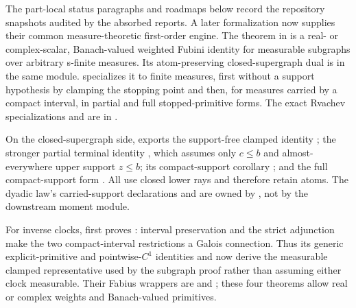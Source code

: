 \documentclass[11pt,oneside]{article}
\theoremstyle{definition}
\theoremstyle{remark}
\newcommand{\1}{\mathbf 1}
\begin{document}
\begin{statusbox}
The part-local status paragraphs and roadmaps below record the repository snapshots audited
by the absorbed reports.  A later formalization now supplies their common
measure-theoretic first-order engine.  The theorem
 in
 is a real- or complex-scalar, Banach-valued weighted Fubini
identity for measurable subgraphs over arbitrary s-finite measures.  Its
atom-preserving closed-supergraph dual is
 in the same module.
 specializes it to finite measures, first without a support
hypothesis by clamping the stopping point and then, for measures carried by a compact
interval, in partial and full stopped-primitive forms.  The exact Rvachev specializations
and
are in .

On the closed-supergraph side,  exports the support-free clamped
identity ; the stronger partial
terminal identity
, which assumes only
\(c\le b\) and almost-everywhere upper support \(z\le b\); its compact-support corollary
; and the full
compact-support form .
All use closed lower rays and therefore retain atoms.  The dyadic law's carried-support
declarations 
and  are owned
by , not by the downstream moment module.

For inverse clocks,  first proves
: interval preservation and the
strict adjunction make the two compact-interval restrictions a Galois connection.  Thus
its generic explicit-primitive and pointwise-\(C^1\) identities
 and
 now derive the measurable clamped
representative used by the subgraph proof rather than assuming either clock measurable.
Their Fabius wrappers are
 and
; these four theorems allow real or
complex weights and Banach-valued primitives.


\end{statusbox}
\end{document}
